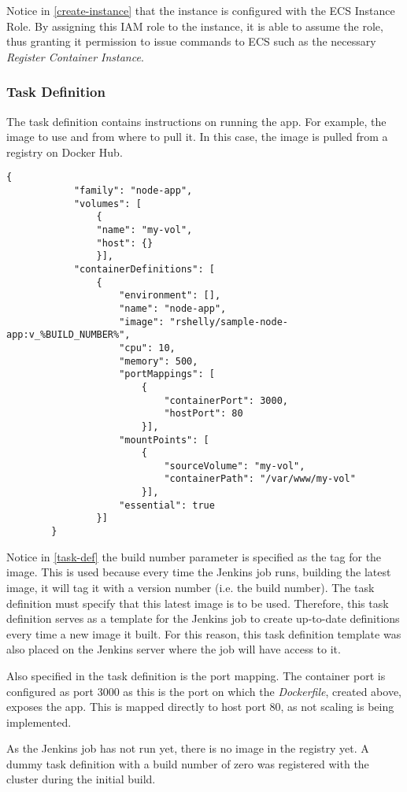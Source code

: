 		Notice in \autoref{create-instance} that the instance is configured with the ECS Instance Role. By assigning this IAM role to the instance, it is able to assume the role, thus granting it permission to issue commands to ECS such as the necessary \textit{Register Container Instance}.
			
		\subsubsection{Task Definition}
		The task definition contains instructions on running the app. For example, the image to use and from where to pull it. In this case, the image is pulled from a registry on Docker Hub.
		
		\begin{minipage}{\textwidth}
		\begin{lstlisting}[caption={Task Definition Template},label=task-def]
		{
			"family": "node-app",
			"volumes": [
				{
				"name": "my-vol",
				"host": {}
				}],
			"containerDefinitions": [
				{
					"environment": [],
					"name": "node-app",
					"image": "rshelly/sample-node-app:v_%BUILD_NUMBER%",
					"cpu": 10,
					"memory": 500,
					"portMappings": [
						{
							"containerPort": 3000,
							"hostPort": 80
						}],
					"mountPoints": [
						{
							"sourceVolume": "my-vol",
							"containerPath": "/var/www/my-vol"
						}],
					"essential": true
				}]
		}	
		\end{lstlisting}
		\end{minipage}
		
		Notice in \autoref{task-def} the build number parameter is specified as the tag for the image. This is used because every time the Jenkins job runs, building the latest image, it will tag it with a version number (i.e. the build number). The task definition must specify that this latest image is to be used. Therefore, this task definition serves as a template for the Jenkins job to create up-to-date definitions every time a new image it built. For this reason, this task definition template was also placed on the Jenkins server where the job will have access to it.
		
		Also specified in the task definition is the port mapping. The container port is configured as port 3000 as this is the port on which the \textit{Dockerfile}, created above, exposes the app. This is mapped directly to host port 80, as not scaling is being implemented.
		
		As the Jenkins job has not run yet, there is no image in the registry yet. A dummy task definition with a build number of zero was registered with the cluster during the initial build.
		
